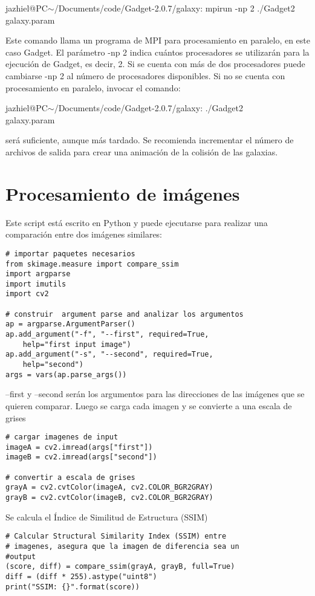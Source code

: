 \documentclass[a4paper,openright,12pt]{book}
\begin{document}
\begin{enumerate}
\textsf{jazhiel@PC$\sim$/Documents/code/Gadget-2.0.7/galaxy: mpirun -np 2 ./Gadget2 galaxy.param}

Este comando llama un programa de MPI para procesamiento en paralelo, en este caso Gadget. El parámetro \textsf{-np 2} indica cuántos procesadores se utilizarán para la ejecución de Gadget, es decir, 2. Si se cuenta con más de dos procesadores puede cambiarse \textsf{-np 2} al número de procesadores disponibles. Si no se cuenta con procesamiento en paralelo, invocar el comando:

\textsf{jazhiel@PC$\sim$/Documents/code/Gadget-2.0.7/galaxy: ./Gadget2\\ galaxy.param}

será suficiente, aunque más tardado. Se recomienda incrementar el número de archivos de salida para crear una animación de la colisión de las galaxias.
\end{enumerate}


\chapter{Procesamiento de imágenes}\label{Apend.B}
Este script está escrito en Python y puede ejecutarse para realizar una comparación entre dos imágenes similares:
\begin{verbatim}
# importar paquetes necesarios
from skimage.measure import compare_ssim
import argparse
import imutils
import cv2
 
# construir  argument parse and analizar los argumentos
ap = argparse.ArgumentParser()
ap.add_argument("-f", "--first", required=True,
	help="first input image")
ap.add_argument("-s", "--second", required=True,
	help="second")
args = vars(ap.parse_args())
\end{verbatim}

\textsf{--first} y \textsf{--second} serán los argumentos para las direcciones de las imágenes que se quieren comparar. Luego se carga cada imagen y se convierte a una escala de grises

\begin{verbatim}
# cargar imagenes de input
imageA = cv2.imread(args["first"])
imageB = cv2.imread(args["second"])
 
# convertir a escala de grises
grayA = cv2.cvtColor(imageA, cv2.COLOR_BGR2GRAY)
grayB = cv2.cvtColor(imageB, cv2.COLOR_BGR2GRAY)
\end{verbatim}

Se calcula el Índice de Similitud de Estructura (SSIM)
\begin{verbatim}
# Calcular Structural Similarity Index (SSIM) entre
# imagenes, asegura que la imagen de diferencia sea un 
#output
(score, diff) = compare_ssim(grayA, grayB, full=True)
diff = (diff * 255).astype("uint8")
print("SSIM: {}".format(score))
\end{verbatim}
\end{document}
